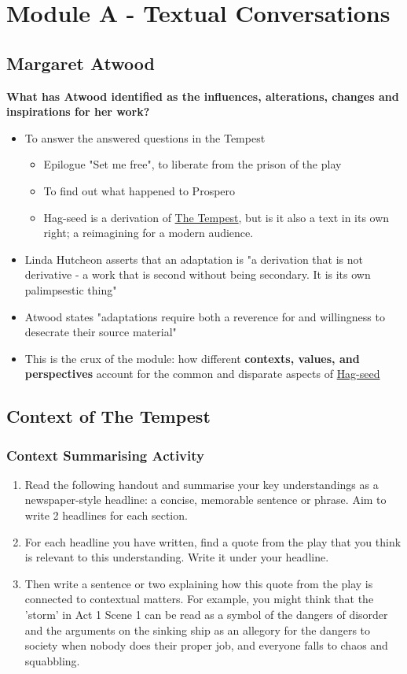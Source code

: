 \chapter{Module A - Textual Conversations}

\section{Margaret Atwood} \label{09/02/2025}
	\textbf{What has Atwood identified as the influences, alterations, changes and inspirations for her work?}
	\begin{itemize}
		\item To answer the answered questions in the Tempest
		\begin{itemize}
			\item Epilogue "Set me free", to liberate from the prison of the play
			\item To find out what happened to Prospero
			\item Hag-seed is a derivation of \underline{The Tempest}, but is it also a text in its own right; a reimagining for a modern audience.
		\end{itemize}
	\item Linda Hutcheon asserts that an adaptation is "a derivation that is not derivative - a work that is second without being secondary. It is its own palimpsestic thing"
	\item Atwood states "adaptations require both a reverence for and willingness to desecrate their source material"
	\item This is the crux of the module: how different \textbf{contexts, values, and perspectives} account for the common and disparate aspects of \underline{Hag-seed}
	\end{itemize}

\newpage

\section{Context of The Tempest} \label{10/02/2025}
	\subsection{Context Summarising Activity}
		\begin{enumerate}
			\item Read the following handout and summarise your key understandings as a newspaper-style headline: a concise, memorable sentence or phrase. Aim to write 2 headlines for each section.
			\item For each headline you have written, find a quote from the play that you think is relevant to this understanding. Write it under your headline.
			\item Then write a sentence or two explaining how this quote from the play is connected to contextual matters. For example, you might think that the 'storm' in Act 1 Scene 1 can be read as a symbol of the dangers of disorder and the arguments on the sinking ship as an allegory for the dangers to society when nobody does their proper job, and everyone falls to chaos and squabbling.
		\end{enumerate}

